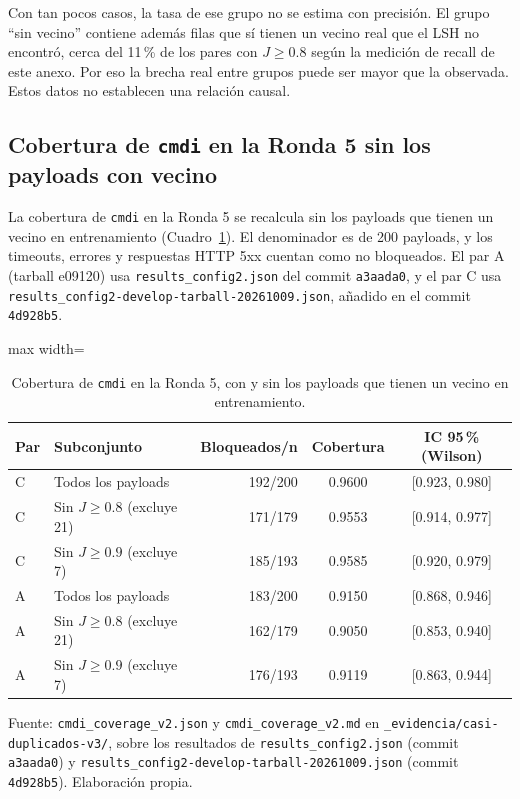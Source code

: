 Con tan pocos casos, la tasa de ese grupo no se estima con precisión. El grupo ``sin vecino'' contiene además filas que sí tienen un vecino real que el LSH no encontró, cerca del 11\,\% de los pares con $J \geq 0.8$ según la medición de recall de este anexo. Por eso la brecha real entre grupos puede ser mayor que la observada. Estos datos no establecen una relación causal.

\subsection{Cobertura de \texttt{cmdi} en la Ronda 5 sin los payloads con vecino}\label{anexo:casi-cobertura-cmdi}

La cobertura de \texttt{cmdi} en la Ronda 5 se recalcula sin los payloads que tienen un vecino en entrenamiento (Cuadro~\ref{tabla:anexo-casi-cmdi-ronda5}). El denominador es de 200 payloads, y los timeouts, errores y respuestas HTTP 5xx cuentan como no bloqueados. El par A (tarball e09120\textellipsis{}) usa \texttt{results\_config2.json} del commit \texttt{a3aada0}, y el par C usa \texttt{results\_config2-develop-tarball-20261009.json}, añadido en el commit \texttt{4d928b5}.

\begin{table}[htbp]
\centering
\footnotesize
\begin{adjustbox}{max width=\linewidth}
\begin{tabular}{|l|l|r|c|c|}
\hline
\textbf{Par} & \textbf{Subconjunto} & \textbf{Bloqueados/n} & \textbf{Cobertura} & \textbf{IC 95\,\% (Wilson)} \\ \hline
C & Todos los payloads & 192/200 & 0.9600 & [0.923, 0.980] \\ \hline
C & Sin $J \geq 0.8$ (excluye 21) & 171/179 & 0.9553 & [0.914, 0.977] \\ \hline
C & Sin $J \geq 0.9$ (excluye 7) & 185/193 & 0.9585 & [0.920, 0.979] \\ \hline
A & Todos los payloads & 183/200 & 0.9150 & [0.868, 0.946] \\ \hline
A & Sin $J \geq 0.8$ (excluye 21) & 162/179 & 0.9050 & [0.853, 0.940] \\ \hline
A & Sin $J \geq 0.9$ (excluye 7) & 176/193 & 0.9119 & [0.863, 0.944] \\ \hline
\end{tabular}
\end{adjustbox}
\caption{Cobertura de \texttt{cmdi} en la Ronda 5, con y sin los payloads que tienen un vecino en entrenamiento.}
\label{tabla:anexo-casi-cmdi-ronda5}
\par\smallskip\footnotesize Fuente: \texttt{cmdi\_coverage\_v2.json} y \texttt{cmdi\_coverage\_v2.md} en \texttt{\_evidencia/casi-duplicados-v3/}, sobre los resultados de \texttt{results\_config2.json} (commit \texttt{a3aada0}) y \texttt{results\_config2-develop-tarball-20261009.json} (commit \texttt{4d928b5}). Elaboración propia.
\end{table}

